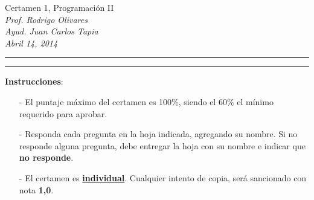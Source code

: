 \documentclass[10pt]{article}
\begin{document}
\begin{center}
    {\Large  Certamen 1, Programaci\'on II} \\
    \emph{\small Prof. Rodrigo Olivares} \\
    \emph{\small Ayud. Juan Carlos Tapia} \\
    \emph{\scriptsize Abril 14, 2014}
\end{center}
\vspace*{-35pt}
\begin{center}
    \rule{1\textwidth}{.3pt}
\end{center}
\vspace*{-42pt}
\begin{center}
    \rule{1\textwidth}{2pt}
\end{center}

\vspace*{-15pt}
{\small \textbf{Instrucciones}:}
\vspace*{-15pt}

{\scriptsize
\begin{itemize}
    \item[-] El puntaje m\'aximo del certamen es 100\%, siendo el 60\% el m\'inimo requerido para aprobar.
    \item[-] Responda cada pregunta en la hoja indicada, agregando su nombre. Si no responde alguna pregunta, debe entregar la hoja con su nombre e indicar que \textbf{no responde}.
    \item[-] El certamen es \underline{\textbf{individual}}. Cualquier intento de copia, ser\'a sancionado con nota \textbf{1,0}.
\end{itemize}
}
\vspace*{10pt}

\vspace*{-30pt}
\end{document}

